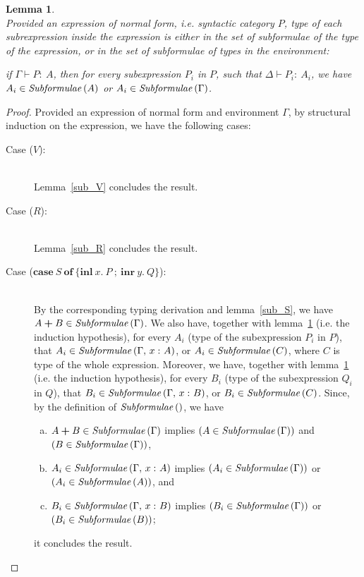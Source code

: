 \documentclass[11p,a4paper]{article}
\newcommand{\typecolor}{}
\newcommand{\termcolor}{}
\newcommand{\tp}[1]{{\typecolor #1}}
\newcommand{\tm}[1]{{\termcolor #1}}
\newtheorem{lemma}[theorem]{Lemma}
\newcommand{\typsum}[2]{#1\boldsymbol{+}#2}
\newcommand{\expcas}[5]{\mathbf{case}\ #1\ \mathbf{of}\ \boldsymbol{\{}\mathbf{inl}\ #2.\ #3\ \boldsymbol{;}\ \mathbf{inr}\ #4.\ #5\boldsymbol{\}}}
\newcommand{\typing}[2]{\tm{#1:\ }\tp{#2}}
\newcommand{\typenvcon}[2]{\tp{\Gamma,}\ \typing{#1}{#2}}
\newcommand{\txt}[1]{\text{\textit{#1}}}
\newcommand{\subformulae}[1]{\txt{Subformulae}\,(#1)}
\begin{document}
\begin{lemma}\ \\
\label{sub_P}
Provided an expression of normal form, i.e. syntactic category $P$,
type of each subrexpression inside the expression is either in the set of
subformulae of the type of the expression, or in the set
of subformulae of types in the environment:

 if $\Gamma \vdash \typing{P}{A}$, then for every subexpression $P_i$
 in $P$, such that $\Delta \vdash \typing{P_i}{A_i}$, we have $A_i \in
 \subformulae{A}$ or $A_i \in \subformulae{\Gamma}$. 
\end{lemma}
\begin{proof}
Provided an expression of normal form and environment $\Gamma$,
by structural induction on the expression, we have the following cases:
\begin{description}
\item[Case ($V$):]\ \\
  Lemma~\ref{sub_V} concludes the result.
\item[Case ($R$):]\ \\
  Lemma~\ref{sub_R} concludes the result.
\item[Case ($\expcas{S}{x}{P}{y}{Q}$):]\ \\
  By the corresponding typing derivation and lemma~\ref{sub_S}, we
  have $\typsum{A}{B} \in \subformulae{\Gamma}$. We also have,
  together with lemma~\ref{sub_P} (i.e. the induction hypothesis), for
  every $A_i$ (type of the subexpression $P_i$ in $P$), that $A_i \in
  \subformulae{\typenvcon{x}{A}}$, or $A_i \in \subformulae{C}$, where
  $C$ is type of the whole expression. Moreover, we have, together
  with lemma~\ref{sub_P} (i.e. the induction hypothesis), for every
  $B_i$ (type of the subexpression $Q_i$ in $Q$), that $B_i \in
  \subformulae{\typenvcon{x}{B}}$, or $B_i \in \subformulae{C}$.
  Since, by the definition of $\subformulae{}$, we have
  \begin{enumerate}[(a)] 
     \item $\typsum{A}{B} \in \subformulae{\Gamma}$ implies $(A \in \subformulae{\Gamma})$ and $(B \in \subformulae{\Gamma})$,
     \item $A_i \in \subformulae{\typenvcon{x}{A}}$ implies $(A_i \in \subformulae{\Gamma})$ or $(A_i \in \subformulae{A})$, and
     \item $B_i \in \subformulae{\typenvcon{x}{B}}$ implies $(B_i \in \subformulae{\Gamma})$ or $(B_i \in \subformulae{B})$; 
  \end{enumerate}
  it concludes the result. 

\end{description}
\end{proof}
\end{document}
